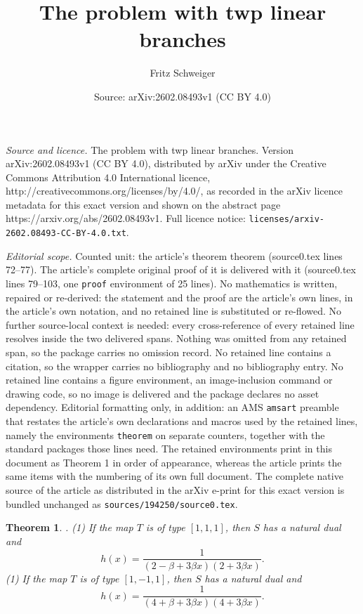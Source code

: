 \documentclass[10pt,a4paper]{amsart}
\title{The problem with twp linear branches}
\author{Fritz Schweiger}
\date{Source: arXiv:2602.08493v1 (CC BY 4.0)}
\newtheorem{theorem}{Theorem}
\begin{document}
\maketitle

\noindent\emph{Source and licence.} The problem with twp linear branches. Version arXiv:2602.08493v1 (CC BY 4.0), distributed by arXiv under the Creative Commons Attribution 4.0 International licence, http://creativecommons.org/licenses/by/4.0/, as recorded in the arXiv licence metadata for this exact version and shown on the abstract page https://arxiv.org/abs/2602.08493v1. Full licence notice: \texttt{licenses/arxiv-2602.08493-CC-BY-4.0.txt}.\par\smallskip

\noindent\textit{Editorial scope.} Counted unit: the article's theorem theorem (source0.tex lines 72--77). The article's complete original proof of it is delivered with it (source0.tex lines 79--103, one \texttt{proof} environment of 25 lines). No mathematics is written, repaired or re-derived: the statement and the proof are the article's own lines, in the article's own notation, and no retained line is substituted or re-flowed.  No further source-local context is needed: every cross-reference of every retained line resolves inside the two delivered spans.  Nothing was omitted from any retained span, so the package carries no omission record.  No retained line contains a citation, so the wrapper carries no bibliography and no bibliography entry.  No retained line contains a figure environment, an image-inclusion command or drawing code, so no image is delivered and the package declares no asset dependency.  Editorial formatting only, in addition: an AMS \texttt{amsart} preamble that restates the article's own declarations and macros used by the retained lines, namely the environments \texttt{theorem} on separate counters, together with the standard packages those lines need.  The retained environments print in this document as Theorem 1 in order of appearance, whereas the article prints the same items with the numbering of its own full document.  The complete native source of the article as distributed in the arXiv e-print for this exact version is bundled unchanged as \texttt{sources/194250/source0.tex}.
\begin{theorem} . 
	(1) If the map $T$ is of type $[1,1,1]$, then  $S$ has a natural dual and 
	$$ h(x) = \frac{1}{(2 - \beta + 3 \beta x) (2 + 3 \beta x )}.$$
	(1) If the map $T$ is of type $[1,-1,1]$, then  $S$ has a natural dual and 
$$ h(x) = \frac{1}{(4+ \beta + 3 \beta x) (4 + 3 \beta x )}.$$
\end{theorem}
\end{document}
